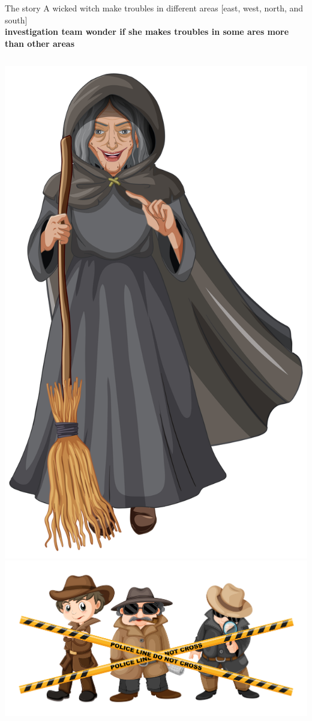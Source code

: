 \documentclass[8pt]{beamer}
\begin{document}
        \begin{frame}{The story}
            A wicked witch make troubles in different areas [east, west, north, and south]\\
            \textbf{investigation team wonder if she makes troubles in some ares more than other areas}\\
            \begin{columns}
                \centering
                \includegraphics[height=.75\textheight]{images/wicked-old-witch.jpg}
                \centering
                \includegraphics[width=.95\textwidth]{images/investigator.jpg}

\end{columns}
\end{frame}
\end{document}
